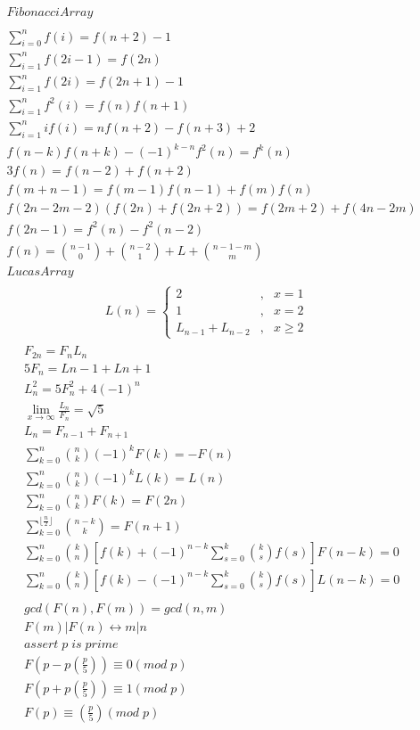 \begin{align*}
& Fibonacci Array \\
& \\
& \sum_{i=0}^nf(i)=f(n+2)-1 \\
& \sum_{i=1}^nf(2i-1)=f(2n) \\
& \sum_{i=1}^nf(2i)=f(2n+1)-1 \\
& \sum_{i=1}^nf^2(i)=f(n)f(n+1) \\
& \sum_{i=1}^nif(i)=nf(n+2)-f(n+3)+2 \\
& f(n-k)f(n+k)-(-1)^{k-n}f^2(n)=f^k(n) \\
& 3f(n)=f(n-2)+f(n+2) \\
& f(m+n-1)=f(m-1)f(n-1)+f(m)f(n) \\
& f(2n-2m-2)(f(2n)+f(2n+2))=f(2m+2)+f(4n-2m) \\
& f(2n-1)=f^2(n)-f^2(n-2) \\
& f(n)=\binom{n-1}{0}+\binom{n-2}{1}+L+\binom{n-1-m}{m} \\
& Lucas Array \\
\end{align*}
$$ L(n)=\left\{
\begin{aligned}
2 & , & x = 1 \\
1 & , & x = 2 \\
L_{n-1}+L_{n-2} & , & x \geq 2
\end{aligned}
\right.
$$
\begin{align*}
& \\
& F_{2n}=F_nL_n \\
& 5F_n=L{n-1}+L{n+1} \\
& L^2_n=5F_n^2+4(-1)^n \\
& \lim\limits_{x \to \infty} \frac{L_n}{F_n} = \sqrt 5 \\
& L_n=F_{n-1}+F_{n+1} \\
& \sum\limits_{k=0}^{n}\binom n k (-1)^kF(k)=-F(n) \\
& \sum\limits_{k=0}^{n}\binom n k (-1)^kL(k)=L(n) \\
& \sum\limits_{k=0}^{n}\binom n k F(k)=F(2n) \\
& \sum\limits_{k=0}^{\lfloor\frac n 2\rfloor}\binom{n-k}{k}=F(n+1) \\
& \sum\limits_{k=0}^{n}\binom k n[f(k)+(-1)^{n-k}\sum\limits_{s=0}^k\binom k sf(s)]F(n-k)=0 \\
& \sum\limits_{k=0}^{n}\binom k n[f(k)-(-1)^{n-k}\sum\limits_{s=0}^k\binom k sf(s)]L(n-k)=0 \\
& \\
& gcd(F(n),F(m))=gcd(n,m) \\
& F(m)|F(n) \leftrightarrow m|n \\
& assert\;p\;is\;prime \\
& F(p-p\left(\frac p 5 \right))\equiv0(mod\;p) \\
& F(p+p\left(\frac p 5 \right))\equiv1(mod\;p) \\
& F(p)\equiv \left(\frac p 5\right)(mod\;p)
\end{align*}
